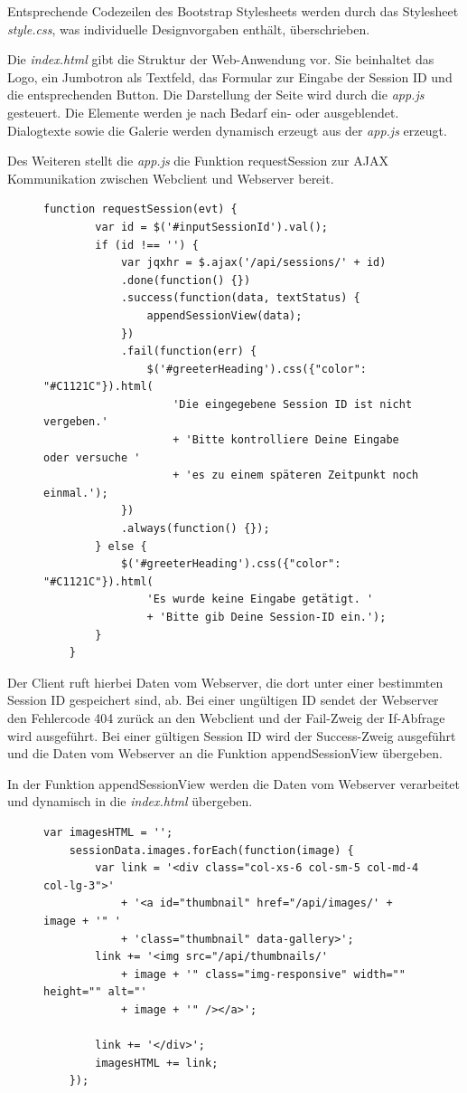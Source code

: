 Entsprechende Codezeilen des Bootstrap Stylesheets werden durch das Stylesheet \textit{style.css}, was individuelle Designvorgaben enthält, überschrieben. 

Die \textit{index.html} gibt die Struktur der Web-Anwendung vor. Sie beinhaltet das Logo, ein Jumbotron als Textfeld, das Formular zur Eingabe der Session ID und die entsprechenden Button.  Die Darstellung der Seite wird durch die \textit{app.js} gesteuert. Die Elemente werden je nach Bedarf ein- oder ausgeblendet. Dialogtexte sowie die Galerie werden dynamisch erzeugt aus der \textit{app.js} erzeugt. 

Des Weiteren stellt die \textit{app.js} die Funktion requestSession zur AJAX Kommunikation zwischen Webclient und Webserver bereit.

\begin{figure}[h]
	\begin{lstlisting}[caption={Auszug aus app.js (Webclient)}, label=list_client]
	function requestSession(evt) {
		var id = $('#inputSessionId').val();
		if (id !== '') {
		    var jqxhr = $.ajax('/api/sessions/' + id)
		    .done(function() {})
		    .success(function(data, textStatus) {
		        appendSessionView(data);
		    })
		    .fail(function(err) {
		        $('#greeterHeading').css({"color": "#C1121C"}).html(
			        'Die eingegebene Session ID ist nicht vergeben.'  
			        + 'Bitte kontrolliere Deine Eingabe oder versuche ' 
			        + 'es zu einem späteren Zeitpunkt noch einmal.');
			})
			.always(function() {});
		} else {
			$('#greeterHeading').css({"color": "#C1121C"}).html(
			    'Es wurde keine Eingabe getätigt. '
			    + 'Bitte gib Deine Session-ID ein.');
		}
	}
	\end{lstlisting}
\end{figure}
\clearpage

Der Client ruft hierbei Daten vom Webserver, die dort unter einer bestimmten Session ID gespeichert sind, ab. Bei einer ungültigen ID sendet der Webserver den Fehlercode 404 zurück an den Webclient und der Fail-Zweig der If-Abfrage wird ausgeführt. Bei einer gültigen Session ID wird der Success-Zweig ausgeführt und die Daten vom Webserver an die Funktion appendSessionView übergeben.

In der Funktion appendSessionView werden die Daten vom Webserver verarbeitet und dynamisch in die \textit{index.html} übergeben.

\begin{figure}[h]
	\begin{lstlisting}[caption={Auszug aus app.js (Webclient)}, label=list_client]
	var imagesHTML = '';
	sessionData.images.forEach(function(image) {
		var link = '<div class="col-xs-6 col-sm-5 col-md-4 col-lg-3">'
			+ '<a id="thumbnail" href="/api/images/' + image + '" '
			+ 'class="thumbnail" data-gallery>';
		link += '<img src="/api/thumbnails/'
			+ image + '" class="img-responsive" width="" height="" alt="' 
			+ image + '" /></a>';
	
		link += '</div>';
		imagesHTML += link;
	});
	\end{lstlisting}
\end{figure}

